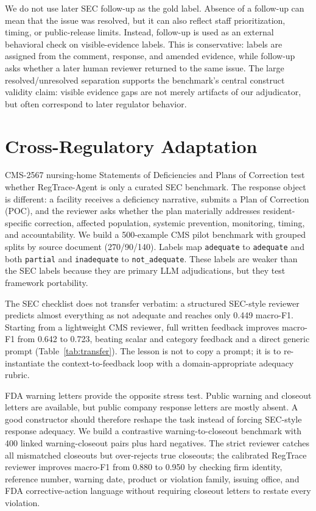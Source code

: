 \documentclass[11pt]{article}
\newcommand{\framework}{RegTrace-Agent}
\begin{document}
We do not use later SEC follow-up as the gold label. Absence of a follow-up can mean that the issue was resolved, but it can also reflect staff prioritization, timing, or public-release limits. Instead, follow-up is used as an external behavioral check on visible-evidence labels. This is conservative: labels are assigned from the comment, response, and amended evidence, while follow-up asks whether a later human reviewer returned to the same issue. The large resolved/unresolved separation supports the benchmark's central construct validity claim: visible evidence gaps are not merely artifacts of our adjudicator, but often correspond to later regulator behavior.

\section{Cross-Regulatory Adaptation}

CMS-2567 nursing-home Statements of Deficiencies and Plans of Correction test whether \framework{} is only a curated SEC benchmark. The response object is different: a facility receives a deficiency narrative, submits a Plan of Correction (POC), and the reviewer asks whether the plan materially addresses resident-specific correction, affected population, systemic prevention, monitoring, timing, and accountability. We build a 500-example CMS pilot benchmark with grouped splits by source document (270/90/140). Labels map \texttt{adequate} to \texttt{adequate} and both \texttt{partial} and \texttt{inadequate} to \texttt{not\_adequate}. These labels are weaker than the SEC labels because they are primary LLM adjudications, but they test framework portability.

The SEC checklist does not transfer verbatim: a structured SEC-style reviewer predicts almost everything as not adequate and reaches only 0.449 macro-F1. Starting from a lightweight CMS reviewer, full written feedback improves macro-F1 from 0.642 to 0.723, beating scalar and category feedback and a direct generic prompt (Table~\ref{tab:transfer}). The lesson is not to copy a prompt; it is to re-instantiate the context-to-feedback loop with a domain-appropriate adequacy rubric.

FDA warning letters provide the opposite stress test. Public warning and closeout letters are available, but public company response letters are mostly absent. A good constructor should therefore reshape the task instead of forcing SEC-style response adequacy. We build a contrastive warning-to-closeout benchmark with 400 linked warning-closeout pairs plus hard negatives. The strict reviewer catches all mismatched closeouts but over-rejects true closeouts; the calibrated RegTrace reviewer improves macro-F1 from 0.880 to 0.950 by checking firm identity, reference number, warning date, product or violation family, issuing office, and FDA corrective-action language without requiring closeout letters to restate every violation.
\end{document}
